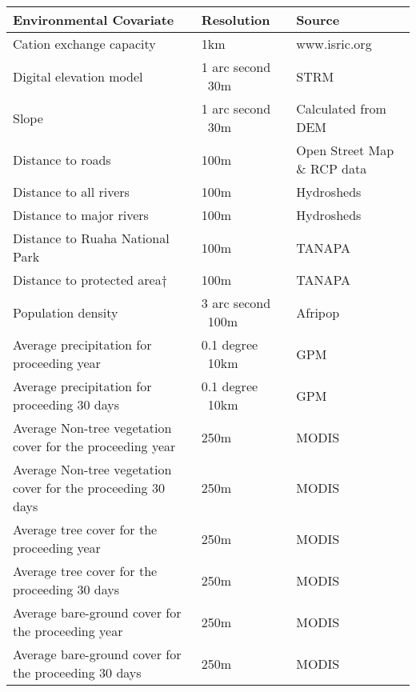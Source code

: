 \begin{table}[h]
	\small
	\begin{center}
		\begin{tabular}{l p{3cm} p{7cm}}
			\hline \hline		
			Environmental Covariate	        		    & Resolution	 			& Source\\ \hline
			Cation exchange capacity	            	& 1km						& www.isric.org\\
			Digital elevation model	    		        & 1 arc second ~30m			& STRM\\
			Slope		        				    	& 1 arc second ~30m			& Calculated from DEM\\
			Distance to roads	        	    		& 100m						& Open Street Map \& RCP data\\
			Distance to all rivers		        	    & 100m						& Hydrosheds\\
			Distance to major rivers	        	    & 100m						& Hydrosheds\\
			Distance to Ruaha National Park	            & 100m						& TANAPA\\
			Distance to protected area$\dagger$	        & 100m						& TANAPA\\
			Population density				            & 3 arc second ~100m		& Afripop\\
			Average precipitation for proceeding year   & 0.1 degree ~10km  		& GPM\\
			Average precipitation for proceeding 30 days
			                                            & 0.1 degree ~10km  		& GPM\\
			Average Non-tree vegetation cover for the proceeding year
			                                            & 250m						& MODIS\\			
			Average Non-tree vegetation cover for the proceeding 30 days
			                                            & 250m						& MODIS\\			
			Average tree cover for the proceeding year
			                                            & 250m						& MODIS\\			
			Average tree cover for the proceeding 30 days
			                                            & 250m						& MODIS\\			
			Average bare-ground cover for the proceeding year
			                                            & 250m						& MODIS\\			
			Average bare-ground cover for the proceeding 30 days
			                                            & 250m						& MODIS\\			         			

\end{tabular}
\end{center}
\end{table}

